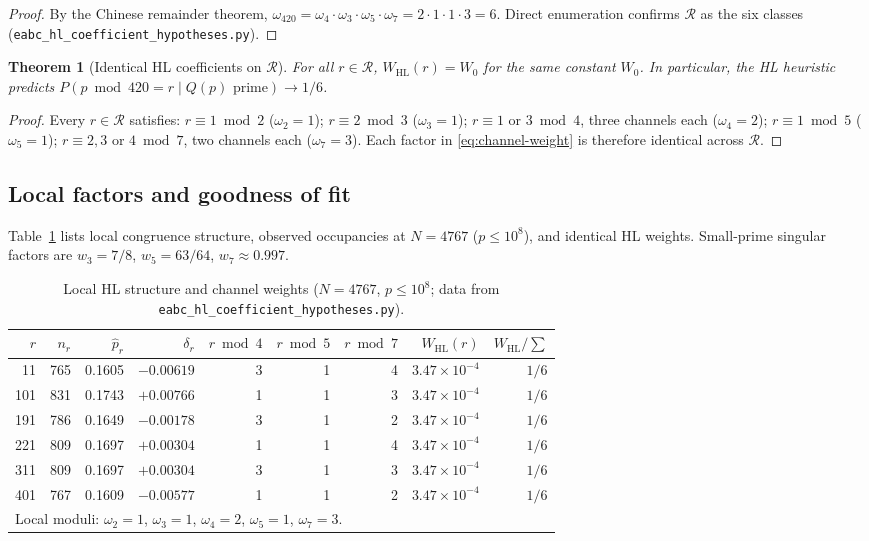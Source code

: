 \documentclass[11pt,a4paper]{article}
\newtheorem{theorem}{Theorem}
\newcommand{\R}{\mathcal{R}}
\begin{document}
\begin{proof}
By the Chinese remainder theorem,
$\omega_{420}=\omega_4\cdot\omega_3\cdot\omega_5\cdot\omega_7
= 2\cdot 1\cdot 1\cdot 3 = 6$.
Direct enumeration confirms $\R$ as the six classes
(\texttt{eabc\_hl\_coefficient\_hypotheses.py}).
\end{proof}

\begin{theorem}[Identical HL coefficients on $\R$]
\label{thm:equal-hl}
For all $r\in\R$, $W_{\mathrm{HL}}(r)=W_0$ for the same constant $W_0$.
In particular, the HL heuristic predicts
$P(p\bmod 420=r\mid Q(p)\text{ prime})\to 1/6$.
\end{theorem}

\begin{proof}
Every $r\in\R$ satisfies:
$r\equiv 1\bmod 2$ ($\omega_2=1$);
$r\equiv 2\bmod 3$ ($\omega_3=1$);
$r\equiv 1$ or $3\bmod 4$, three channels each ($\omega_4=2$);
$r\equiv 1\bmod 5$ ($\omega_5=1$);
$r\equiv 2,3$ or $4\bmod 7$, two channels each ($\omega_7=3$).
Each factor in \eqref{eq:channel-weight} is therefore identical
across $\R$.
\end{proof}

\subsection{Local factors and goodness of fit}

Table~\ref{tab:hl-coefficients} lists local congruence structure,
observed occupancies at $N=4767$ ($p\le 10^8$), and identical
HL weights.
Small-prime singular factors are
$w_3=7/8$, $w_5=63/64$, $w_7\approx 0.997$.

\begin{table}[ht]
\centering
\caption{Local HL structure and channel weights ($N=4767$, $p\le 10^8$;
data from \texttt{eabc\_hl\_coefficient\_hypotheses.py}).}
\label{tab:hl-coefficients}
\begin{tabular}{@{}rrrrrrrrr@{}}
\toprule
$r$ & $n_r$ & $\hat p_r$ & $\delta_r$ &
$r\bmod 4$ & $r\bmod 5$ & $r\bmod 7$ &
$W_{\mathrm{HL}}(r)$ & $W_{\mathrm{HL}}/\sum$ \\
\midrule
 11 & 765 & 0.1605 & $-0.00619$ & 3 & 1 & 4 & $3.47\times 10^{-4}$ & $1/6$ \\
101 & 831 & 0.1743 & $+0.00766$ & 1 & 1 & 3 & $3.47\times 10^{-4}$ & $1/6$ \\
191 & 786 & 0.1649 & $-0.00178$ & 3 & 1 & 2 & $3.47\times 10^{-4}$ & $1/6$ \\
221 & 809 & 0.1697 & $+0.00304$ & 1 & 1 & 4 & $3.47\times 10^{-4}$ & $1/6$ \\
311 & 809 & 0.1697 & $+0.00304$ & 3 & 1 & 3 & $3.47\times 10^{-4}$ & $1/6$ \\
401 & 767 & 0.1609 & $-0.00577$ & 1 & 1 & 2 & $3.47\times 10^{-4}$ & $1/6$ \\
\midrule
\multicolumn{8}{l}{Local moduli: $\omega_2{=}1$, $\omega_3{=}1$, $\omega_4{=}2$,
$\omega_5{=}1$, $\omega_7{=}3$.} \\
\bottomrule
\end{tabular}
\end{table}
\end{document}
